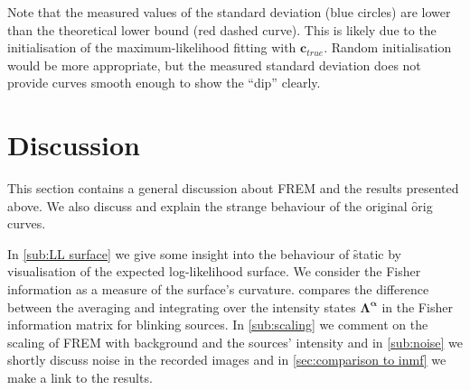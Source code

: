 Note that the measured values of the standard deviation (blue circles) are lower than the theoretical lower bound (red dashed curve). This is likely due to the initialisation of the maximum-likelihood fitting with $\bm{c}_{true}$. Random initialisation would be more appropriate, but the measured standard deviation does not provide curves smooth enough to show the ``dip'' clearly.

\afterpage{\clearpage}


\section{Discussion\label{sec:FREM discussion}}

This section contains a general discussion about FREM and the results presented above. We also discuss and explain the strange behaviour of the original \f{orig} curves. 

In \autoref{sub:LL surface} we give some insight into the behaviour of \f{static} by visualisation of the expected log-likelihood surface. We consider the Fisher information as a measure of the surface's curvature.  compares the difference between the averaging and integrating over the intensity states $\bm{\Lambda^\alpha}$ in the Fisher information matrix for blinking sources. In \autoref{sub:scaling} we comment on the scaling of FREM with background and the sources' intensity and in \autoref{sub:noise} we shortly discuss noise in the recorded images and in \autoref{sec:comparison to inmf} we make a link to the \inmf{} results. 


